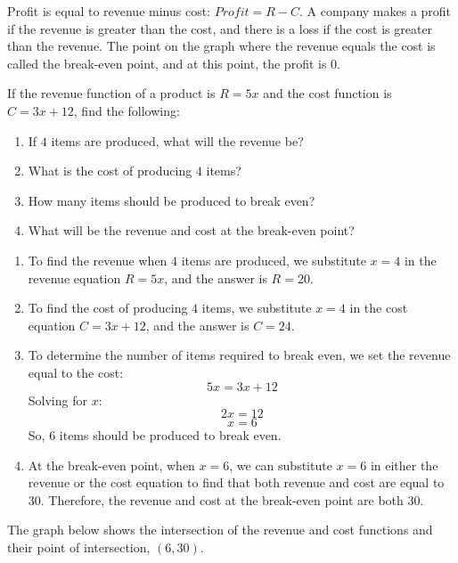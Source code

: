 Profit is equal to revenue minus cost: $Profit = R - C$. A company makes a profit if the revenue is greater than the cost, and there is a loss if the cost is greater than the revenue. The point on the graph where the revenue equals the cost is called the break-even point, and at this point, the profit is $0$.

\begin{example}
If the revenue function of a product is $R = 5x$ and the cost function is $C = 3x + 12$, find the following:
\begin{enumerate}
  \item If $4$ items are produced, what will the revenue be?
  \item What is the cost of producing $4$ items?
  \item How many items should be produced to break even?
  \item What will be the revenue and cost at the break-even point?
\end{enumerate}
\end{example}

\begin{solution}
\begin{enumerate}
  \item To find the revenue when $4$ items are produced, we substitute $x = 4$ in the revenue equation $R = 5x$, and the answer is $R = 20$.
  \item To find the cost of producing $4$ items, we substitute $x = 4$ in the cost equation $C = 3x + 12$, and the answer is $C = 24$.
  \item To determine the number of items required to break even, we set the revenue equal to the cost:
  \[5x = 3x + 12\]
  Solving for $x$:
  \[2x = 12\]
  \[x = 6\]
  So, $6$ items should be produced to break even.
  \item At the break-even point, when $x = 6$, we can substitute $x = 6$ in either the revenue or the cost equation to find that both revenue and cost are equal to $30$. Therefore, the revenue and cost at the break-even point are both $30$.
\end{enumerate}

The graph below shows the intersection of the revenue and cost functions and their point of intersection, $(6, 30)$.
\end{solution}

